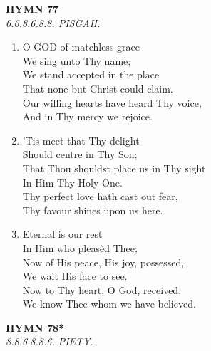 \newpage
\begin{center}
    {\Large \textbf{HYMN 77}}
    \\
    \textit{6.6.8.6.8.8. PISGAH.}
\end{center}
\vspace{1em}

\begin{enumerate}
    \item O GOD of matchless grace \\
        We sing unto Thy name; \\
        We stand accepted in the place \\
        That none but Christ could claim. \\
        Our willing hearts have heard Thy voice, \\
        And in Thy mercy we rejoice.

    \item 'Tis meet that Thy delight \\
        Should centre in Thy Son; \\
        That Thou shouldst place us in Thy sight \\
        In Him Thy Holy One. \\
        Thy perfect love hath cast out fear, \\
        Thy favour shines upon us here.

    \item Eternal is our rest \\
        In Him who pleas\`ed Thee; \\
        Now of His peace, His joy, possessed, \\
        We wait His face to see. \\
        Now to Thy heart, O God, received, \\
        We know Thee whom we have believed.

\end{enumerate}

\newpage
\begin{center}
    {\Large \textbf{HYMN 78*}}
    \\
    \textit{8.8.6.8.8.6. PIETY.}
\end{center}
\vspace{1em}


